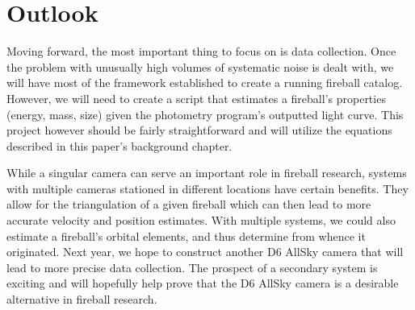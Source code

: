 \section{Outlook}

Moving forward, the most important thing to focus on is data collection.
Once the problem with unusually high volumes of systematic noise is dealt with, we will have most of the framework established to create a running fireball catalog.
However, we will need to create a script that estimates a fireball's properties (energy, mass, size) given the photometry program's outputted light curve.
This project however should be fairly straightforward and will utilize the equations described in this paper's background chapter.

While a singular camera can serve an important role in fireball research, systems with multiple cameras stationed in different locations have certain benefits.
They allow for the triangulation of a given fireball which can then lead to more accurate velocity and position estimates.
With multiple systems, we could also estimate a fireball's orbital elements, and thus determine from whence it originated.
Next year, we hope to construct another D6 AllSky camera that will lead to more precise data collection. 
The prospect of a secondary system is exciting and will hopefully help prove that the D6 AllSky camera is a desirable alternative in fireball research.


